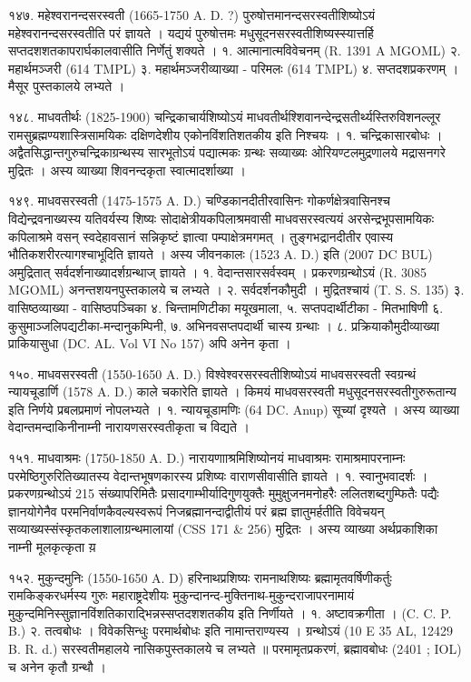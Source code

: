 १४७. महेश्वरानन्दसरस्वती (1665-1750 A. D. ?)
पुरुषोत्तमानन्दसरस्वतीशिष्योऽयं महेश्वरानन्दसरस्वतीति परं ज्ञायते । यद्ययं पुरुषोत्तमः मधुसूदनसरस्वतीशिष्यस्स्यात्तर्हि सप्तदशशतकापरार्घकालवासीति निर्णेतुं शक्यते ।
१. आत्मानात्मविवेचनम् (R. 1391 A MGOML)
२. महार्थमञ्जरी (614 TMPL)
३. महार्थमञ्जरीव्याख्या - परिमलः (614 TMPL)
४. सप्तदशप्रकरणम् । मैसूर पुस्तकालये लभ्यते ।

१४८. माधवतीर्थः (1825-1900)
चन्द्रिकाचार्यशिष्योऽयं माधवतीर्थश्शिवानन्देन्द्रसतीर्थ्यस्तिरुविशनल्लूर रामसुब्रह्मण्यशास्त्रिसामयिकः दक्षिणदेशीय एकोनविंशतिशतकीय इति निश्चयः ।
१. चन्द्रिकासारबोधः । अद्वैतसिद्धान्तगुरुचन्द्रिकाग्रन्थस्य सारभूतोऽयं पद्यात्मकः ग्रन्थः सव्याख्यः ओरियण्टलमुद्रणालये मद्रासनगरे मुद्रितः । अस्य व्याख्या शिवनन्दकृता स्वात्मादर्शाख्या ।

१४९. माधवसरस्वती (1475-1575 A. D.)
चण्डिकानदीतीरवासिनः गोकर्णक्षेत्रवासिनश्च विद्येन्द्रवनाख्यस्य यतिवर्यस्य शिष्यः सोदाक्षेत्रीयकपिलाश्रमवासी माधवसरस्वत्ययं अरसेन्द्रभूपसामयिकः कपिलाश्रमे वसन् स्वदेहावसानं सन्निकृष्टं ज्ञात्वा पम्पाक्षेत्रमगमत् । तुङ्गभद्रानदीतीर एवास्य भौतिकशरीरत्यागश्चाभूदिति ज्ञायते । अस्य जीवनकालः (1523 A. D.) इति (2007 DC BUL) अमुद्रितात् सर्वदर्शनाख्यादर्शग्रन्थाज् ज्ञायते ।
१. वेदान्तसारसर्वस्वम् । प्रकरणग्रन्थोऽयं (R. 3085 MGOML) अनन्तशयनपुस्तकालये च लभ्यते ।
२. सर्वदर्शनकौमुदी । मुद्रितश्चायं (T. S. S. 135)
३. वासिष्ठव्याख्या - वासिष्ठपञ्चिका
४. चिन्तामणिटीका मयूखमाला, 
५. सप्तपदार्थीटीका - मितभाषिणी
६. कुसुमाञ्जलिपद्यटीका-मन्दानुकम्पिनी,
७. अभिनवसप्तपदार्थी चास्य ग्रन्थाः ।
८. प्रक्रियाकौमुदीव्याख्या प्राकियासुधा (DC. AL. Vol VI No 157) अपि अनेन कृता ।

१५०. माधवसरस्वती (1550-1650 A. D.)
विश्वेश्वरसरस्वतीशिष्योऽयं माधवसरस्वती स्वग्रन्थं न्यायचूडार्णि (1578 A. D.) काले चकारेति ज्ञायते । किमयं माधवसरस्वती मधुसूदनसरस्वतीगुरुरूतान्य इति निर्णये प्रबलप्रमाणं नोपलभ्यते ।
१. न्यायचूडामणिः (64 DC. Anup) सूच्यां दृश्यते । अस्य व्याख्या वेदान्तमन्दाकिनीनाम्नी नारायणसरस्वतीकृता च विद्यते ।

१५१. माधवाश्रमः (1750-1850 A. D.)
नारायणााश्रमिशिष्योनयं माधवाश्रमः रामाश्रमापरनाम्नः परमेष्ठिगुरुरितिख्यातस्य वेदान्तभूषणकारस्य प्रशिष्यः वाराणसीवासीति ज्ञायते ।
१. स्वानुभवादर्शः । प्रकरणग्रन्थोऽयं 215 संख्यापरिमितैः प्रसादगाम्भीर्यादिगुणयुक्तैः मुमुक्षुजनमनोहरैः ललितशब्दगुम्फितैः पद्यैः ज्ञानयोगेनैव परमनिर्वाणकैवल्यस्वरूपं निजब्रह्मानन्दाद्वीतीयं परं ब्रह्म ज्ञातुमर्हतीति विवेचयन् सव्याख्यस्संस्कृतकलाशालाग्रन्थमालायां (CSS 171 & 256) मुद्रितः । अस्य व्याख्या अर्थप्रकाशिका नाम्नी मूलकृत्कृता य़

१५२. मुकुन्दमुनिः (1550-1650 A. D)
हरिनाथप्रशिष्यः रामनाथशिष्यः ब्रह्मामृतवर्षिणीकर्तुः रामकिङ्करधर्मस्य गुरुः महाराष्ट्रदेशीयः मुकुन्दानन्द-मुक्तिनाथ-मुकुन्दराजापरनामायं मुकुन्दमिनिस्सुज्ञानविंशतिकाराद्भिन्नस्सप्तदशशतकीय इति निर्णीयते ।
१. अष्टावक्रगीता । (C. C. P. B.)
२. तत्वबोधः । विवेकसिन्धुः परमार्थबोधः इति नामान्तराण्यस्य । ग्रन्थोऽयं (10 E 35 AL, 12429 B. R. d.) सरस्वतीमहालये नासिकपुस्तकालये च लभ्यते ॥ परमामृतप्रकरणं, ब्रह्मावबोधः (2401 ; IOL) च अनेन कृतौ ग्रन्थौ ।

